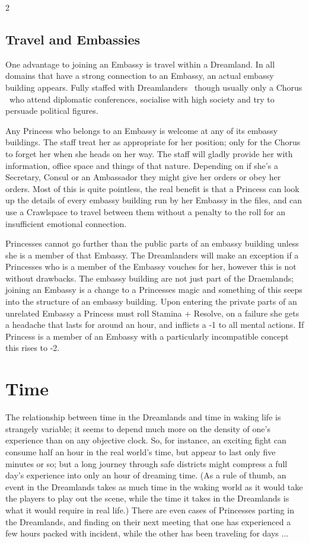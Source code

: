 \begin{multicols}{2}
\subsection*{Travel and Embassies}

One advantage to joining an Embassy is travel within a Dreamland. In all domains that have a strong connection to an Embassy, an actual embassy building appears. Fully staffed with Dreamlanders \textendash\, though usually only a Chorus \textendash\, who attend diplomatic conferences, socialise with high society and try to persuade political figures.

Any Princess who belongs to an Embassy is welcome at any of its embassy buildings. The staff treat her as appropriate for her position; only for the Chorus to forget her when she heads on her way. The staff will gladly provide her with information, office space and things of that nature. Depending on if she's a Secretary, Consul or an Ambassador they might give her orders or obey her orders. Most of this is quite pointless, the real benefit is that a Princess can look up the details of every embassy building run by her Embassy in the files, and can use a Crawlspace to travel between them without a penalty to the roll for an insufficient emotional connection.

Princesses cannot go further than the public parts of an embassy building unless she is a member of that Embassy. The Dreamlanders will make an exception if a Princesses who is a member of the Embassy vouches for her, however this is not without drawbacks. The embassy building are not just part of the Draemlands; joining an Embassy is a change to a Princesses magic and something of this seeps into the structure of an embassy building. Upon entering the private parts of an unrelated Embassy a Princess must roll Stamina + Resolve, on a failure she gets a headache that lasts for around an hour, and inflicts a -1 to all mental actions. If Princess is a member of an Embassy with a particularly incompatible concept this rises to -2.

\section*{Time}

The relationship between time in the Dreamlands and time in waking life is strangely variable; it seems to depend much more on the density of one's experience than on any objective clock.  So, for instance, an exciting fight can consume half an hour in the real world's time, but appear to last only five minutes or so; but a long journey through safe districts might compress a full day's experience into only an hour of dreaming time.  (As a rule of thumb, an event in the Dreamlands takes as much time in the waking world as it would take the players to play out the scene, while the time it takes in the Dreamlands is what it would require in real life.)  There are even cases of Princesses parting in the Dreamlands, and finding on their next meeting that one has experienced a few hours packed with incident, while the other has been traveling for days ...


\end{multicols}
